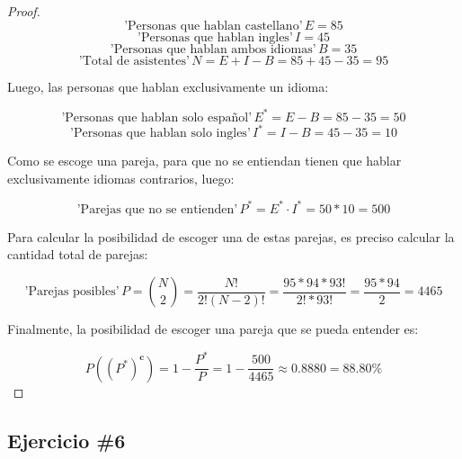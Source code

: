 \documentclass[12pt,a4paper]{article}
\begin{document}
\begin{proof}

  \begin{equation*}
    \text{'Personas que hablan castellano'}\,E=85
  \end{equation*}
  \begin{equation*}
    \text{'Personas que hablan ingles'}\,I=45
  \end{equation*}
  \begin{equation*}
    \text{'Personas que hablan ambos idiomas'}\,B=35
  \end{equation*}
  \begin{equation*}
    \text{'Total de asistentes'}\,N=E+I-B=85+45-35=95
  \end{equation*}

  Luego, las personas que hablan exclusivamente un idioma:

  \begin{equation*}
    \text{'Personas que hablan solo español'}\,E^{*}=E-B=85-35=50
  \end{equation*}
  \begin{equation*}
    \text{'Personas que hablan solo ingles'}\,I^{*}=I-B=45-35=10
  \end{equation*}

  Como se escoge una pareja, para que no se entiendan tienen que hablar exclusivamente idiomas contrarios, luego:

  \begin{equation*}
    \text{'Parejas que no se entienden'}\,P^{*}=E^{*}\cdot I^{*}=50*10=500
  \end{equation*}

  Para calcular la posibilidad de escoger una de estas parejas, es preciso calcular la cantidad total de parejas:

  \begin{equation*}
    \text{'Parejas posibles'}\,P=\binom{N}{2}=\frac{N!}{2!(N-2)!}=\frac{95*94*93!}{2!*93!}=\frac{95*94}{2}=4465
  \end{equation*}

  Finalmente, la posibilidad de escoger una pareja que se pueda entender es:

  \begin{equation*}
    P((P^{*})^{\textbf{c}})=1-\frac{P^{*}}{P}=1-\frac{500}{4465}\approx0.8880=88.80\%
  \end{equation*}
\end{proof}

\subsection{Ejercicio \#6}
\end{document}
